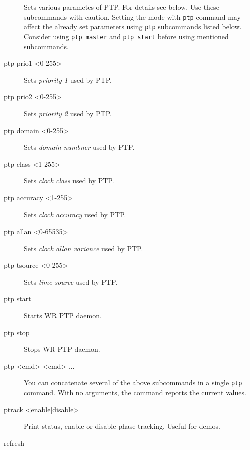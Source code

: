 \documentclass[a4paper, 12pt]{article}
\renewcommand{\_}{\underscore\allowbreak}
\begin{document}
\begin{description}
  Sets various parametes of PTP. For details see below.  Use these
  subcommands with caution. Setting the mode with \texttt{ptp} command
  may affect the already set parameters using \texttt{ptp} subcommands
  listed below.  Consider using \texttt{ptp master} and \texttt{ptp start}
  before using mentioned subcommands.

\item[ptp prio1 <0-255>] \mbox{}

  Sets \textit{priority 1} used by PTP.

\item[ptp prio2 <0-255>] \mbox{}

  Sets \textit{priority 2} used by PTP.

\item[ptp domain <0-255>] \mbox{}

  Sets \textit{domain numbner} used by PTP.
\item[ptp class <1-255>] \mbox{}

  Sets \textit{clock class} used by PTP.

\item[ptp accuracy <1-255>] \mbox{}

  Sets \textit{clock accuracy} used by PTP.

\item[ptp allan <0-65535>] \mbox{}

  Sets \textit{clock allan variance} used by PTP.

\item[ptp tsource <0-255>] \mbox{}

  Sets \textit{time source} used by PTP.

\item[ptp start] \mbox{}

  Starts WR PTP daemon.

\item[ptp stop] \mbox{}

  Stops WR PTP daemon.

\item[ptp <cmd> <cmd> ...] \mbox{}

  You can concatenate several of the above subcommands in a single
  \texttt{ptp} command. With no arguments, the command reports the
  current values.

\item[ptrack <enable|disable>] \mbox{}

  Print status, enable or disable phase tracking. Useful for demos.

\item[refresh] \mbox{}


\end{description}
\end{document}
